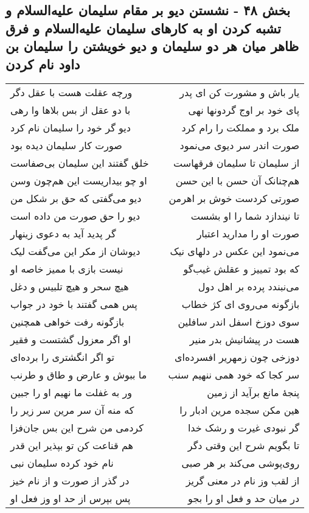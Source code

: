 \begin{center}
\section*{بخش ۴۸ - نشستن دیو بر مقام سلیمان علیه‌السلام و تشبه کردن او به کارهای سلیمان  علیه‌السلام و فرق ظاهر میان هر دو سلیمان و دیو خویشتن را سلیمان بن داود نام کردن}
\label{sec:sh048}
\begin{longtable}{l p{0.5cm} r}
ورچه عقلت هست با عقل دگر
&&
یار باش و مشورت کن ای پدر
\\
با دو عقل از بس بلاها وا رهی
&&
پای خود بر اوج گردونها نهی
\\
دیو گر خود را سلیمان نام کرد
&&
ملک برد و مملکت را رام کرد
\\
صورت کار سلیمان دیده بود
&&
صورت اندر سر دیوی می‌نمود
\\
خلق گفتند این سلیمان بی‌صفاست
&&
از سلیمان تا سلیمان فرقهاست
\\
او چو بیداریست این هم‌چون وسن
&&
هم‌چنانک آن حسن با این حسن
\\
دیو می‌گفتی که حق بر شکل من
&&
صورتی کردست خوش بر اهرمن
\\
دیو را حق صورت من داده است
&&
تا نیندازد شما را او بشست
\\
گر پدید آید به دعوی زینهار
&&
صورت او را مدارید اعتبار
\\
دیوشان از مکر این می‌گفت لیک
&&
می‌نمود این عکس در دلهای نیک
\\
نیست بازی با ممیز خاصه او
&&
که بود تمییز و عقلش غیب‌گو
\\
هیچ سحر و هیچ تلبیس و دغل
&&
می‌نبندد پرده بر اهل دول
\\
پس همی گفتند با خود در جواب
&&
بازگونه می‌روی ای کژ خطاب
\\
بازگونه رفت خواهی همچنین
&&
سوی دوزخ اسفل اندر سافلین
\\
او اگر معزول گشتست و فقیر
&&
هست در پیشانیش بدر منیر
\\
تو اگر انگشتری را برده‌ای
&&
دوزخی چون زمهریر افسرده‌ای
\\
ما ببوش و عارض و طاق و طرنب
&&
سر کجا که خود همی ننهیم سنب
\\
ور به غفلت ما نهیم او را جبین
&&
پنجهٔ مانع برآید از زمین
\\
که منه آن سر مرین سر زیر را
&&
هین مکن سجده مرین ادبار را
\\
کردمی من شرح این بس جان‌فزا
&&
گر نبودی غیرت و رشک خدا
\\
هم قناعت کن تو بپذیر این قدر
&&
تا بگویم شرح این وقتی دگر
\\
نام خود کرده سلیمان نبی
&&
روی‌پوشی می‌کند بر هر صبی
\\
در گذر از صورت و از نام خیز
&&
از لقب وز نام در معنی گریز
\\
پس بپرس از حد او وز فعل او
&&
در میان حد و فعل او را بجو
\\
\end{longtable}
\end{center}
